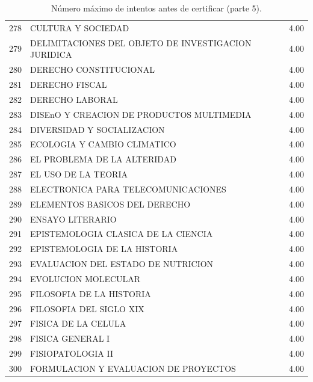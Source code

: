 \documentclass[12pt]{article}
\begin{document}
\begin{table}[ht]
{\begin{tabular}{rlr}
  278 & CULTURA Y SOCIEDAD & 4.00 \\ 
  279 & DELIMITACIONES DEL OBJETO DE INVESTIGACION JURIDICA & 4.00 \\ 
  280 & DERECHO CONSTITUCIONAL & 4.00 \\ 
  281 & DERECHO FISCAL & 4.00 \\ 
  282 & DERECHO LABORAL & 4.00 \\ 
  283 & DISEnO Y CREACION DE PRODUCTOS MULTIMEDIA & 4.00 \\ 
  284 & DIVERSIDAD Y SOCIALIZACION & 4.00 \\ 
  285 & ECOLOGIA Y CAMBIO CLIMATICO & 4.00 \\ 
  286 & EL PROBLEMA DE LA ALTERIDAD & 4.00 \\ 
  287 & EL USO DE LA TEORIA & 4.00 \\ 
  288 & ELECTRONICA PARA TELECOMUNICACIONES & 4.00 \\ 
  289 & ELEMENTOS BASICOS DEL DERECHO & 4.00 \\ 
  290 & ENSAYO LITERARIO & 4.00 \\ 
  291 & EPISTEMOLOGIA CLASICA DE LA CIENCIA & 4.00 \\ 
  292 & EPISTEMOLOGIA DE LA HISTORIA & 4.00 \\ 
  293 & EVALUACION DEL ESTADO DE NUTRICION & 4.00 \\ 
  294 & EVOLUCION MOLECULAR & 4.00 \\ 
  295 & FILOSOFIA DE LA HISTORIA & 4.00 \\ 
  296 & FILOSOFIA DEL SIGLO XIX & 4.00 \\ 
  297 & FISICA DE LA CELULA & 4.00 \\ 
  298 & FISICA GENERAL I & 4.00 \\ 
  299 & FISIOPATOLOGIA II & 4.00 \\ 
  300 & FORMULACION Y EVALUACION DE PROYECTOS & 4.00 \\ 
   \hline
\end{tabular}}
\caption{\label{Num_Max_Intentos_Cert_5} N\'umero m\'aximo de intentos antes de certificar (parte 5).}

\end{table}
\end{document}
